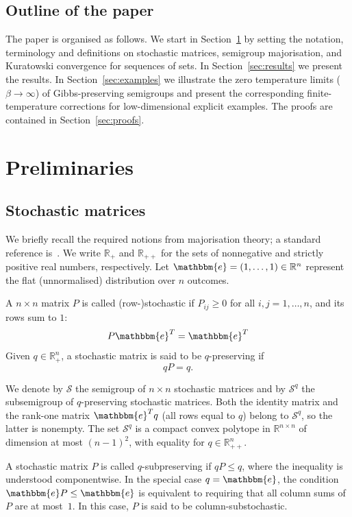 \documentclass[11pt,a4paper,longbibliography]{amsart}
\numberwithin{equation}{section}
\def\R{{\mathbb R}}
\def\R{{\mathbb R}}
\def\e{\mathbbm{e}}
\theoremstyle{plain}
\theoremstyle{definition}
\theoremstyle{remark}
\begin{document}
	\subsection{Outline of the paper}
	\label{sec:outline}
	The paper is organised as follows. We start in Section~\ref{sec:preparatory} by setting the notation, terminology and definitions on stochastic matrices, semigroup majorisation, and Kuratowski convergence for sequences of sets. In Section~\ref{sec:results} we present the results. In Section~\ref{sec:examples} we illustrate the zero temperature limits ($\beta\to\infty$) of Gibbs-preserving semigroups and present the corresponding finite-temperature corrections for low-dimensional explicit examples. The proofs are contained in Section~\ref{sec:proofs}.
	\section{Preliminaries}
	\label{sec:preparatory}
	
	\subsection{Stochastic matrices}
	
	We briefly recall the required notions from majorisation theory; a standard reference is~\cite{marshall1979inequalities}.
	We write $\R_+$ and $\R_{++}$ for the sets of nonnegative and strictly positive real numbers, respectively. Let $\e=(1,\dots,1)\in\R^n$ represent the flat (unnormalised) distribution over $n$ outcomes.
	
	A $n\times n$ matrix $P$ is called (row-)stochastic if $P_{ij}\geq0$ for all $i,j=1,\ldots, n$, and its rows sum to $1$:
	\begin{equation}
		P \e^T=\e^T
	\end{equation}
	Given $q\in\R_+^n$, a stochastic matrix is said to be $q$-preserving if
	\begin{equation}
		qP=q.
	\end{equation}
	
	
	We denote by $\mathcal{S}$ the semigroup of $n\times n$ stochastic matrices and by $\mathcal{S}^q$ the subsemigroup of $q$-preserving stochastic matrices. Both the identity matrix and the rank-one matrix $\e^T q$ (all rows equal to $q$) belong to $\mathcal{S}^q$, so the latter is nonempty. 
	The set $\mathcal{S}^q$ is a compact convex polytope in $\R^{n\times n}$ of dimension at most $(n-1)^2$, with equality for $q\in\R_{++}^n$.
	
	A stochastic matrix $P$ is called {$q$-subpreserving} if $qP\leq q$,
	where the inequality is understood componentwise.
	In the special case $q=\e$, the condition
	$\e P\leq \e$
	is equivalent to requiring that all column sums of $P$ are at most~$1$. In this case, $P$ is said to be {column-substochastic}.
	
\end{document}
